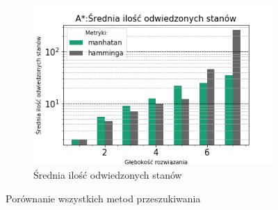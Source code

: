 \documentclass{classrep}
\begin{document}
\begin{figure}[H]
\begin{subfigure}[t]{0.45\textwidth}
        \includegraphics[width=\textwidth]{charts/ASTR_visited.png}
        \caption{Średnia ilość odwiedzonych stanów}
        \label{ASTR:visited}
    \end{subfigure}
    \caption{Porównanie wszystkich metod przeszukiwania}\label{coll:astr}
\end{figure}
\end{document}
